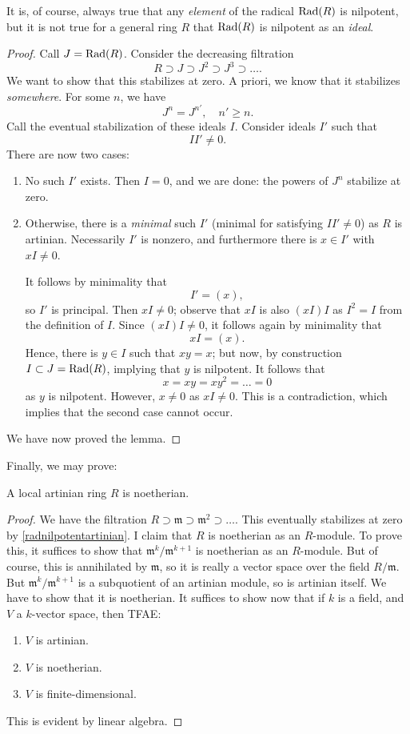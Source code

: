 It is, of course, always true that any \emph{element} of the radical $\operatorname{Rad}(R)$
is nilpotent, but it is not true for a general ring $R$ that $\operatorname{Rad}(R)$ is
nilpotent as an \emph{ideal}.

\begin{proof} 
Call $J = \operatorname{Rad}(R)$. Consider the decreasing filtration
\[ R \supset J \supset J^2 \supset J^3 \supset \dots.  \]
We want to show that this stabilizes at zero. A priori, we know that it
stabilizes \emph{somewhere}. For some $n$, we have
\[ J^n = J^{n'}, \quad n' \geq n.  \]
Call the eventual stabilization of these ideals $I$. Consider ideals $I'$ such
that
\[ II' \neq 0.  \]
There are now two cases:
\begin{enumerate}
\item No such $I'$ exists. Then $I = 0$, and we are done: the powers of
$J^n$ stabilize at zero. 
\item Otherwise,  there is a
\emph{minimal} such $I'$ (minimal for satisfying $II' \neq 0$) as $R$ is
artinian. Necessarily $I'$ is nonzero, and furthermore there is $x \in I'$ with $x I \neq
0$. 

It follows by minimality that
\[ I' = (x) , \]
so $I'$ is principal. Then $xI \neq 0$; observe
that $xI$ is also $(xI)I $ as $I^2  = I$ from the definition of $I$. Since
$(xI) I \neq 0$, it follows again by minimality that
\[ xI = (x).  \] Hence, there is $y \in I$ such that $xy = x$; but now, by construction $I \subset J = \operatorname{Rad} (R)$, implying that $y $ is nilpotent.
It follows that
\[ x = xy = xy^2 = \dots = 0  \]
as $y$ is nilpotent. However, $x \neq 0$ as $xI \neq 0$. This is a
contradiction, which implies that the second case cannot occur. 
\end{enumerate}
We have now proved the lemma.
\end{proof} 

Finally, we may prove:

\begin{lemma} 
A local artinian ring $R$ is noetherian.
\end{lemma} 
\begin{proof} 
We have the filtration $R \supset \mathfrak{m} \supset \mathfrak{m}^2 \supset
\dots$. This eventually stabilizes at zero by \cref{radnilpotentartinian}. I
claim that $R$ is noetherian as an $R$-module. To prove this, it suffices to
show that $\mathfrak{m}^k/\mathfrak{m}^{k+1}$ is noetherian as an $R$-module.
But of course, this is annihilated by $\mathfrak{m}$, so it is really a vector
space over the field $R/\mathfrak{m}$. But $\mathfrak{m}^k/\mathfrak{m}^{k+1}$
is a subquotient of an artinian module, so is artinian itself. We have to show
that it is noetherian. 
It suffices to show now that if $k$ is a field, and $V$ a $k$-vector space,
then TFAE:
\begin{enumerate}
\item $V$ is artinian. 
\item $V$ is noetherian.
\item $V$ is finite-dimensional.
\end{enumerate}
This is evident by linear algebra. 	
\end{proof} 

